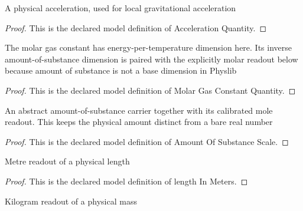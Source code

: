 \begin{definition}
  \label{def:physics:phyx-mini-0360:phyxminiproblems-problemphyxmini0360-accelerationquantity}
  A physical acceleration, used for local gravitational acceleration
\end{definition}
\begin{proof}
  This is the declared model definition of Acceleration Quantity.
\end{proof}
\begin{definition}
  \label{def:physics:phyx-mini-0360:phyxminiproblems-problemphyxmini0360-molargasconstantquantity}
  The molar gas constant has energy-per-temperature dimension here. Its inverse amount-of-substance dimension is paired with the explicitly molar readout below because amount of substance is not a base dimension in Physlib
\end{definition}
\begin{proof}
  This is the declared model definition of Molar Gas Constant Quantity.
\end{proof}
\begin{definition}
  \label{def:physics:phyx-mini-0360:phyxminiproblems-problemphyxmini0360-amountofsubstancescale}
  An abstract amount-of-substance carrier together with its calibrated mole readout. This keeps the physical amount distinct from a bare real number
\end{definition}
\begin{proof}
  This is the declared model definition of Amount Of Substance Scale.
\end{proof}
\begin{definition}
  \label{def:physics:phyx-mini-0360:phyxminiproblems-problemphyxmini0360-lengthinmeters}
  Metre readout of a physical length
\end{definition}
\begin{proof}
  This is the declared model definition of length In Meters.
\end{proof}
\begin{definition}
  \label{def:physics:phyx-mini-0360:phyxminiproblems-problemphyxmini0360-massinkilograms}
  Kilogram readout of a physical mass
\end{definition}
